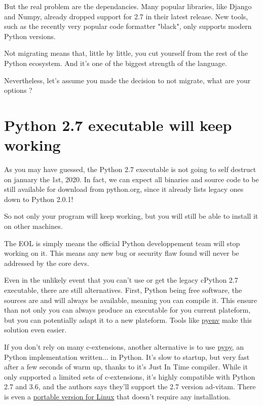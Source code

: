 But the real problem are the dependancies. Many popular libraries, like Django and Numpy, already dropped support for 2.7 in their latest release. New tools, such as the recently very popular code formatter "black", only supports modern Python versions.

Not migrating means that, little by little, you cut yourself from the rest of the Python ecosystem. And it's one of the biggest strength of the language.

Nevertheless, let's assume you made the decision to not migrate, what are your options ?

\section{Python 2.7 executable will keep working}

As you may have guessed, the Python 2.7 executable is not going to self destruct on january the 1st, 2020. In fact, we can expect all binaries and source code to be still available for download from python.org, since it already lists legacy ones down to Python 2.0.1!

So not only your program will keep working, but you will still be able to install it on other machines.

The \gls{EOL} is simply means the official Python developpement team will stop working on it. This means any new bug or security flaw found will never be addressed by the core devs.

Even in the unlikely event that you can't use or get the legacy cPython 2.7 executable, there are still alternatives. First, Python being free software, the sources are and will always be available, meaning you can compile it. This ensure than not only you can always produce an executable for you current plateform, but you can potentially adapt it to a new plateform. Tools like \href{https://github.com/pyenv/pyenv}{pyenv} make this solution even easier.

If you don't rely on many c-extensions, another alternative is to use \href{https://pypy.org}{pypy}, an Python implementation written... in Python. It's slow to startup, but very fast after a few seconds of warm up, thanks to it's Just In Time compiler. While it only supported a limited sets of c-extensions, it's highly compatible with Python 2.7 and 3.6, and the authors says they'll support the 2.7 version ad-vitam. There is even a \href{https://github.com/squeaky-pl/portable-pypy}{portable version for Linux} that doesn't require any installation.


